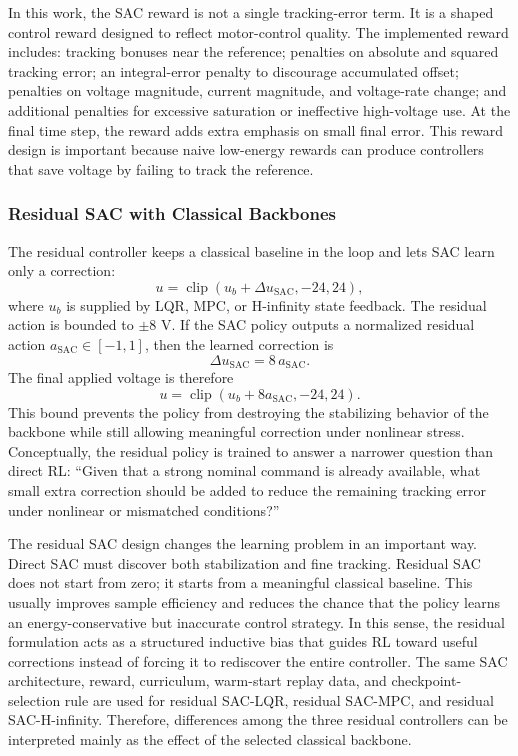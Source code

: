 \documentclass[conference]{IEEEtran}
\begin{document}
In this work, the SAC reward is not a single tracking-error term. It is a shaped control reward designed to reflect motor-control quality. The implemented reward includes: tracking bonuses near the reference; penalties on absolute and squared tracking error; an integral-error penalty to discourage accumulated offset; penalties on voltage magnitude, current magnitude, and voltage-rate change; and additional penalties for excessive saturation or ineffective high-voltage use. At the final time step, the reward adds extra emphasis on small final error. This reward design is important because naive low-energy rewards can produce controllers that save voltage by failing to track the reference.

\subsubsection{Residual SAC with Classical Backbones}
The residual controller keeps a classical baseline in the loop and lets SAC learn only a correction:
\begin{equation}
u = \operatorname{clip}(u_b + \Delta u_{\mathrm{SAC}}, -24, 24),
\end{equation}
where $u_b$ is supplied by LQR, MPC, or H-infinity state feedback.
The residual action is bounded to $\pm 8$ V. If the SAC policy outputs a normalized residual action $a_{\mathrm{SAC}} \in [-1,1]$, then the learned correction is
\begin{equation}
\Delta u_{\mathrm{SAC}} = 8\, a_{\mathrm{SAC}}.
\end{equation}
The final applied voltage is therefore
\begin{equation}
u = \operatorname{clip}(u_b + 8 a_{\mathrm{SAC}}, -24, 24).
\end{equation}
This bound prevents the policy from destroying the stabilizing behavior of the backbone while still allowing meaningful correction under nonlinear stress. Conceptually, the residual policy is trained to answer a narrower question than direct RL: ``Given that a strong nominal command is already available, what small extra correction should be added to reduce the remaining tracking error under nonlinear or mismatched conditions?''

The residual SAC design changes the learning problem in an important way. Direct SAC must discover both stabilization and fine tracking. Residual SAC does not start from zero; it starts from a meaningful classical baseline. This usually improves sample efficiency and reduces the chance that the policy learns an energy-conservative but inaccurate control strategy. In this sense, the residual formulation acts as a structured inductive bias that guides RL toward useful corrections instead of forcing it to rediscover the entire controller. The same SAC architecture, reward, curriculum, warm-start replay data, and checkpoint-selection rule are used for residual SAC-LQR, residual SAC-MPC, and residual SAC-H-infinity. Therefore, differences among the three residual controllers can be interpreted mainly as the effect of the selected classical backbone.
\end{document}
